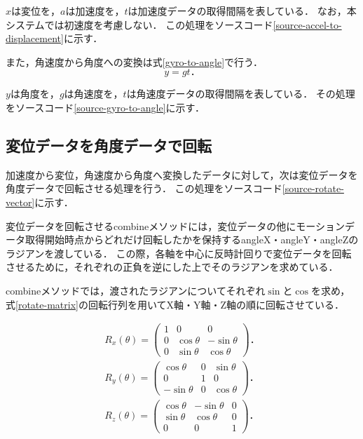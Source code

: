 $x$は変位を，$a$は加速度を，$t$は加速度データの取得間隔を表している．
なお，本システムでは初速度を考慮しない．
この処理をソースコード\ref{source-accel-to-displacement}に示す．



また，角速度から角度への変換は式\ref{gyro-to-angle}で行う．
\begin{equation}
\label{gyro-to-angle}
y = g t．
\end{equation}

$y$は角度を，$g$は角速度を，$t$は角速度データの取得間隔を表している．
その処理をソースコード\ref{source-gyro-to-angle}に示す．



\subsection{変位データを角度データで回転}
加速度から変位，角速度から角度へ変換したデータに対して，次は変位データを角度データで回転させる処理を行う．
この処理をソースコード\ref{source-rotate-vector}に示す．



変位データを回転させるcombineメソッドには，変位データの他にモーションデータ取得開始時点からどれだけ回転したかを保持するangleX・angleY・angleZのラジアンを渡している．
この際，各軸を中心に反時計回りで変位データを回転させるために，それぞれの正負を逆にした上でそのラジアンを求めている．

combineメソッドでは，渡されたラジアンについてそれぞれ$\sin$と$\cos$を求め，式\ref{rotate-matrix}の回転行列を用いてX軸・Y軸・Z軸の順に回転させている．

\begin{eqnarray}
\label{rotate-matrix}
R_x(\theta) = \left(
    \begin{array}{ccc}
        1 & 0 & 0 \\
        0 & \cos\theta & -\sin\theta \\
        0 & \sin\theta & \cos\theta
    \end{array}
\right)． \nonumber \\
R_y(\theta) = \left(
    \begin{array}{ccc}
        \cos\theta & 0 & \sin\theta \\
        0 & 1 & 0 \\
        -\sin\theta & 0 & \cos\theta
    \end{array}
\right)． \nonumber \\
R_z(\theta) = \left(
    \begin{array}{ccc}
        \cos\theta & -\sin\theta & 0 \\
        \sin\theta & \cos\theta & 0 \\
        0 & 0 & 1
    \end{array}
\right)．
\end{eqnarray}

